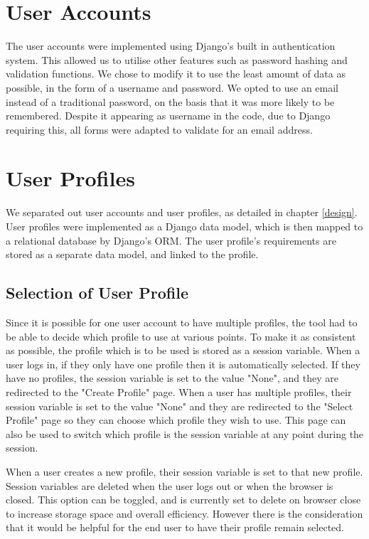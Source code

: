 \documentclass{l4proj}
\begin{document}
\section{User Accounts}
The user accounts were implemented using Django's built in authentication system. This allowed us to utilise other features such as password hashing and validation functions. We chose to modify it to use the least amount of data as possible, in the form of a username and password. We opted to use an email instead of a traditional password, on the basis that it was more likely to be remembered. Despite it appearing as username in the code, due to Django requiring this, all forms were adapted to validate for an email address. 


\section{User Profiles}
We separated out user accounts and user profiles, as detailed in chapter \ref{design}. User profiles were implemented as a Django data model, which is then mapped to a relational database by Django's ORM. The user profile's requirements are stored as a separate data model, and linked to the profile. 

\subsection{Selection of User Profile}
Since it is possible for one user account to have multiple profiles, the tool had to be able to decide which profile to use at various points. To make it as consistent as possible, the profile which is to be used is stored as a session variable.  When a user logs in, if they only have one profile then it is automatically selected. If they have no profiles, the session variable is set to the value "None", and they are redirected to the "Create Profile" page. When a user has multiple profiles, their session variable is set to the value "None" and they are redirected to the "Select Profile" page so they can choose which profile they wish to use.
This page can also be used to switch which profile is the session variable at any point during the session. 

When a user creates a new profile, their session variable is set to that new profile. 
Session variables are deleted when the user logs out or when the browser is closed. This option can be toggled, and is currently set to delete on browser close to increase storage space and overall efficiency. However there is the consideration that it would be helpful for the end user to have their profile remain selected. 
\end{document}
